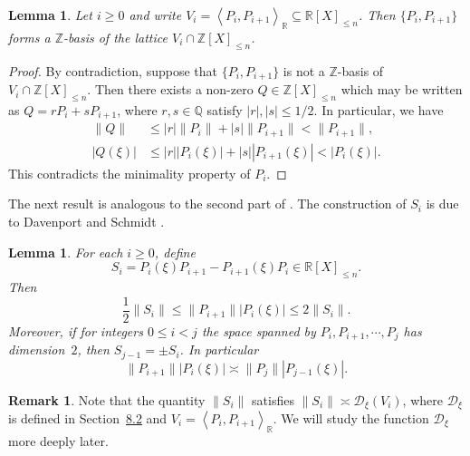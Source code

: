 \documentclass[10pt,a4paper]{amsart}
\numberwithin{equation}{section}
\newcommand\bQ{\mathbb{Q}}
\newcommand\bR{\mathbb{R}}
\newcommand\bZ{\mathbb{Z}}
\newcommand\HHstar{\mathcal{D}_{\xi}}
\newcommand{\normH}[1]{\|#1\|}
\newcommand{\Vect}[2][]{\left\la #2\right\ra_{#1}}
\let\subset \subseteq
\let\la\langle
\let\ra\rangle
\theoremstyle{definition}
\newtheorem{Rem}[Def]{Remark}
\theoremstyle{plain}
\newtheorem{Lem}[Def]{Lemma}
\begin{document}
\begin{Lem}
\label{Lem: P_i, P_i+1 est une Z-base}
Let $i\geq 0$ and write $V_i = \Vect[\bR]{P_i,P_{i+1}} \subset \bR[X]_{\leq n}$. Then $\{P_i, P_{i+1}\}$ forms a $\bZ$-basis of the lattice $V_i\cap \bZ[X]_{\leq n}$.
\end{Lem}

\begin{proof}
By contradiction, suppose that $\{P_i, P_{i+1}\}$ is not a $\bZ$-basis of $V_i\cap \bZ[X]_{\leq n}$. Then there exists a non-zero $Q\in \bZ[X]_{\leq n}$ which may be written as $Q = rP_i + sP_{i+1}$, where $r,s\in\bQ$ satisfy $|r|,|s|\leq 1/2$. In particular, we have
\begin{align*}
\normH{Q} &\leq |r|\normH{P_i} + |s|\normH{P_{i+1}} < \normH{P_{i+1}}, \\
|Q(\xi)| &\leq |r||P_i(\xi)| + |s||P_{i+1}(\xi)| < |P_{i}(\xi)|.
\end{align*}
This contradicts the minimality property of $P_i$.
\end{proof}

The next result is analogous to the second part of \cite[Lem.\,4.1]{roy2004approximation}. The construction of $S_i$ is due to Davenport and Schmidt \cite{davenport1967approximation}.

\begin{Lem}
\label{Lem: P_iH_i+1 = P_j-1H_j}
For each $i\geq 0$, define
\[
S_i = P_i(\xi)P_{i+1} - P_{i+1}(\xi)P_i \in\bR[X]_{\leq n}.
\]
Then
\[
\frac{1}{2}\normH{S_i} \leq \normH{P_{i+1}}|P_i(\xi)| \leq 2\normH{S_i}.
\]
Moreover, if for integers $0\leq i < j$ the space spanned by $P_i, P_{i+1}, \cdots, P_{j}$ has dimension~$2$, then $S_{j-1} = \pm S_i$. In particular
\[
\normH{P_{i+1}}|P_i(\xi)| \asymp \normH{P_{j}}|P_{j-1}(\xi)|.
\]
\end{Lem}

\begin{Rem}
Note that the quantity $\normH{S_i}$ satisfies $\normH{S_i} \asymp \HHstar(V_i)$, where $\HHstar$ is defined in Section~\href{https://jep.centre-mersenne.org/item/10.5802/jep.265.pdf#page=20}{8.2} and $V_i=\Vect[\bR]{P_i,P_{i+1}}$. We will study the function $\HHstar$ more deeply later.
\end{Rem}
\end{document}
